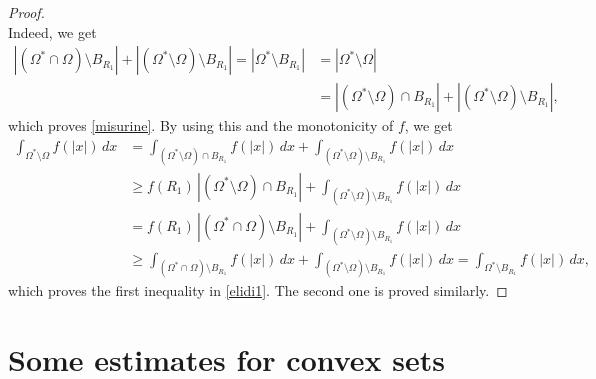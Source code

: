 \documentclass{amsart}
\theoremstyle{definition}
\numberwithin{equation}{section}
\begin{document}
\begin{proof}
\begin{equation}
\end{equation}
Indeed, we get
\[
\begin{split}
|(\Omega^*\cap\Omega)\setminus B_{R_1}|+|(\Omega^*\setminus \Omega)\setminus B_{R_1}|=|\Omega^*\setminus B_{R_1}|&=|\Omega^*\setminus\Omega|\\
&=|(\Omega^*\setminus\Omega)\cap B_{R_1}|+|(\Omega^*\setminus\Omega)\setminus B_{R_1}|,
\end{split}
\]
which proves \eqref{misurine}. By using this and the monotonicity of $f$, we get
\[
\begin{split}
\int_{\Omega^*\setminus\Omega} f(|x|)\, dx&=\int_{(\Omega^*\setminus \Omega)\cap B_{R_1}} f(|x|)\,dx+\int_{(\Omega^*\setminus \Omega)\setminus B_{R_1}} f(|x|)\,dx\\
&\ge f(R_1)\,|(\Omega^*\setminus \Omega)\cap B_{R_1}|+\int_{(\Omega^*\setminus \Omega)\setminus B_{R_1}} f(|x|)\,dx\\
&=f(R_1)\,|(\Omega^*\cap\Omega)\setminus B_{R_1}|+\int_{(\Omega^*\setminus \Omega)\setminus B_{R_1}} f(|x|)\,dx\\
&\ge \int_{(\Omega^*\cap\Omega)\setminus B_{R_1}} f(|x|)\,dx+\int_{(\Omega^*\setminus \Omega)\setminus B_{R_1}} f(|x|)\,dx=\int_{\Omega^*\setminus B_{R_1}} f(|x|)\,dx,
\end{split}
\]
which proves the first inequality in \eqref{elidi1}. The second one is proved similarly.
\end{proof}

\section{Some estimates for convex sets}
\end{document}
